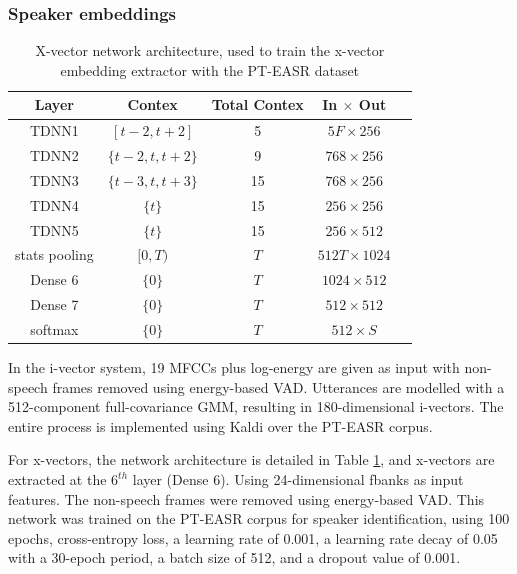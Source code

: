 \subsubsection{Speaker embeddings}
\begin{table}[h]
  \centering
  \begin{tabular}{ccccc}
  \hline
  Layer & Contex & Total Contex & In $\times$ Out \\
  \hline
  TDNN1 & $[t-2, t+2]$ & 5 & $5F \times 256$ & \\
  TDNN2 & $\{t-2, t, t+2\}$ & 9 & $768 \times 256$ & \\
  TDNN3 & $\{t-3, t, t+3\}$ & 15 & $768 \times 256$ & \\
  TDNN4 & $\{t\}$ & 15 & $256 \times 256$ & \\
  TDNN5 & $\{t\}$ & 15 & $256 \times 512$ & \\
  stats pooling & $[0, T)$ & $T$ & $512T \times 1024$ & \\
  Dense 6 & $\{0\}$ & $T$ & $1024 \times 512$ & \\
  Dense 7 & $\{0\}$ & $T$ & $512 \times 512$ & \\
  softmax & $\{0\}$ & $T$ & $512 \times S$ & \\
  \hline
  \end{tabular}
  \caption{X-vector network architecture, used to train the x-vector embedding extractor with the PT-EASR dataset}
  \label{tab:xvect_description}
  \end{table}
  In the i-vector system, 19 \acp{MFCC} plus log-energy are given as input with non-speech frames removed using energy-based \ac{VAD}. Utterances are modelled with a 512-component full-covariance \ac{GMM}, resulting in 180-dimensional i-vectors. The entire process is implemented using Kaldi \cite{kaldi} over the PT-EASR corpus.

  For x-vectors, the network architecture is detailed in Table \ref{tab:xvect_description}, and x-vectors are extracted at the $6^{th}$ layer (Dense 6). Using 24-dimensional \ac{fbanks} as input features. The non-speech frames were removed using energy-based \ac{VAD}. This network was trained on the PT-EASR corpus for speaker identification, using 100 epochs, cross-entropy loss, a learning rate of 0.001, a learning rate decay of 0.05 with a 30-epoch period, a batch size of 512, and a dropout value of 0.001.

